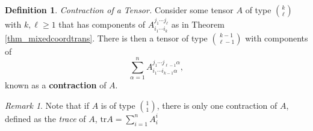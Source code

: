 \documentclass[10pt,landscape]{article}
\theoremstyle{definition}
\newtheorem{definition}{Definition}[section]
\theoremstyle{theorem}
\theoremstyle{summary}
\theoremstyle{remark}
\newtheorem*{remark}{Remark}
\begin{document}
\begin{multicols*}{3}
\theoremstyle{definition}
\begin{definition}{\textit{Contraction of a Tensor.}}
    Consider some tensor $A$ of type $\binom{k}{\ell}$ with $k,\ell\geq 1$ that has components of $A_{i_1\cdots i_k}^{j_1\cdots j_\ell}$ as in Theorem \ref{thm_mixedcoordtrans}. There is then a tensor of type $\binom{k-1}{\ell-1}$ with components of
    \begin{equation}
        \sum\limits_{\alpha=1}^nA_{i_1\cdots i_{k-1}\alpha}^{j_1\cdots j_{\ell - 1}\alpha},
    \end{equation}
    known as a \textbf{contraction} of $A$.
\end{definition}
\begin{remark}
    Note that if $A$ is of type $\binom{1}{1}$, there is only one contraction of $A$, defined as the \textit{trace} of $A$, $\text{tr}A=\sum\limits_{i=1}^nA_i^i$
\end{remark}
 
\end{multicols*}
\end{document}

